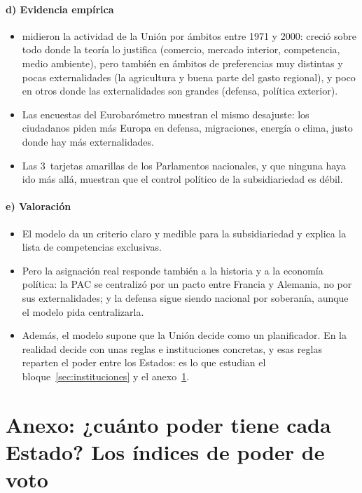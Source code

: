 \documentclass[11pt]{article}
\begin{document}
\paragraph{d) Evidencia empírica}

\begin{itemize}
\item \textcite{AlesinaAngeloniSchuknecht2005} midieron la actividad de la Unión por ámbitos entre 1971 y 2000: creció sobre todo donde la teoría lo justifica (comercio, mercado interior, competencia, medio ambiente), pero también en ámbitos de preferencias muy distintas y pocas externalidades (la agricultura y buena parte del gasto regional), y poco en otros donde las externalidades son grandes (defensa, política exterior).
\item Las encuestas del Eurobarómetro muestran el mismo desajuste: los ciudadanos piden más Europa en defensa, migraciones, energía o clima, justo donde hay más externalidades.
\item Las 3~tarjetas amarillas de los Parlamentos nacionales, y que ninguna haya ido más allá, muestran que el control político de la subsidiariedad es débil.
\end{itemize}

\paragraph{e) Valoración}

\begin{itemize}
\item El modelo da un criterio claro y medible para la subsidiariedad y explica la lista de competencias exclusivas.
\item Pero la asignación real responde también a la historia y a la economía política: la PAC se centralizó por un pacto entre Francia y Alemania, no por sus externalidades; y la defensa sigue siendo nacional por soberanía, aunque el modelo pida centralizarla.
\item Además, el modelo supone que la Unión decide como un planificador. En la realidad decide con unas reglas e instituciones concretas, y esas reglas reparten el poder entre los Estados: es lo que estudian el bloque~\ref{sec:instituciones} y el anexo~\ref{anexo:poder}.
\end{itemize}

\section{Anexo: ¿cuánto poder tiene cada Estado?\cortetitulo{} Los índices de poder de voto}\label{anexo:poder}
\end{document}
